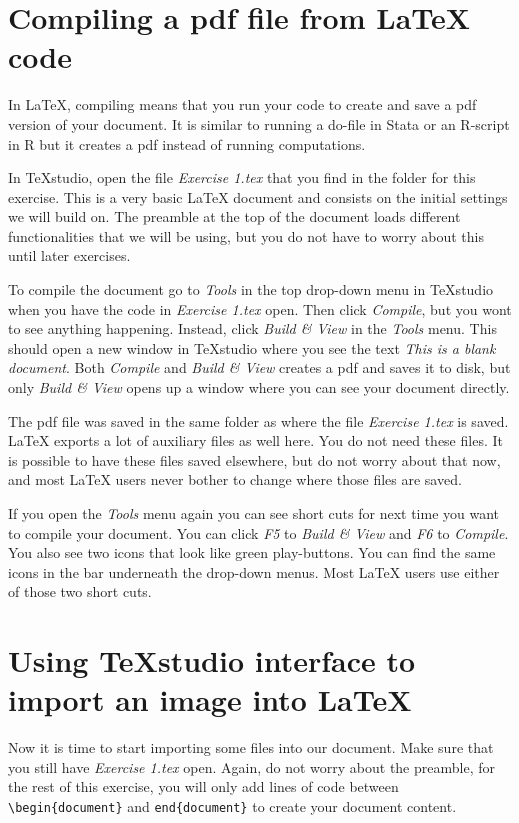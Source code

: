 \documentclass[12pts]{article}
\begin{document}
	\section{Compiling a pdf file from  {\LaTeX} code}
	In {\LaTeX}, compiling means that you run your code to create and save a pdf version of your document. It is similar to running a do-file in Stata or an R-script in R but it creates a pdf instead of running computations. 
	
	In TeXstudio, open the file \emph{Exercise 1.tex} that you find in the folder for this exercise. This is a very basic {\LaTeX} document and consists on the initial settings we will build on. The preamble at the top of the document loads different functionalities that we will be using, but you do not have to worry about this until later exercises.
	
	To compile the document go to \emph{Tools} in the top drop-down menu in TeXstudio when you have the code in \emph{Exercise 1.tex} open. Then click \emph{Compile}, but you wont to see anything happening. Instead, click \emph{Build \& View} in the \emph{Tools} menu. This should open a new window in TeXstudio where you see the text \emph{This is a blank document}. Both \emph{Compile} and \emph{Build \& View} creates a pdf and saves it to disk, but only \emph{Build \& View} opens up a window where you can see your document directly. 
	
	The pdf file was saved in the same folder as where the file \emph{Exercise 1.tex} is saved. {\LaTeX} exports a lot of auxiliary files as well here. You do not need these files. It is possible to have these files saved elsewhere, but do not worry about that now, and most {\LaTeX} users never bother to change where those files are saved.
	
	If you open the \emph{Tools} menu again you can see short cuts for next time you want to compile your document. You can click \emph{F5} to \emph{Build \& View} and \emph{F6} to \emph{Compile}. You also see two icons that look like green play-buttons. You can find the same icons in the bar underneath the drop-down menus. Most {\LaTeX} users use either of those two short cuts.
	
	\section{Using TeXstudio interface to import an image into \LaTeX}
	Now it is time to start importing some files into our document. Make sure that you still have \emph{Exercise 1.tex} open. Again, do not worry about the preamble, for the rest of this exercise, you will only add lines of code between \verb|\begin{document}| and \verb|end{document}| to create your document content.
	
\end{document}

